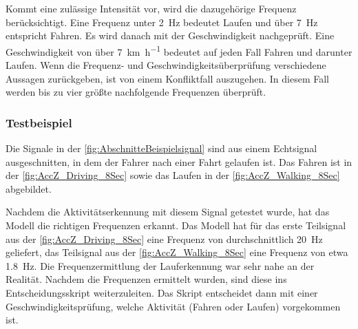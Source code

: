 Kommt eine zulässige Intensität vor, wird die dazugehörige Frequenz berücksichtigt. Eine Frequenz unter \SI{2}{\hertz} bedeutet \glqq Laufen\grqq{} und über \SI{7}{\hertz} entspricht \glqq Fahren\grqq{}. Es wird danach mit der Geschwindigkeit nachgeprüft. Eine Geschwindigkeit von über \SI[per-mode = symbol]{7}{\kilo\meter\per\hour} bedeutet auf jeden Fall \glqq Fahren\grqq{} und darunter \glqq Laufen\grqq{}.
Wenn die Frequenz- und Geschwindigkeitsüberprüfung verschiedene Aussagen zurückgeben, ist von einem Konfliktfall auszugehen. In diesem Fall werden bis zu vier größte nachfolgende Frequenzen überprüft.


\subsubsection{Testbeispiel}
Die Signale in der \autoref{fig:AbschnitteBeispielsignal} sind aus einem Echtsignal ausgeschnitten, in dem der Fahrer nach einer Fahrt gelaufen ist. Das Fahren ist in der \autoref{fig:AccZ_Driving_8Sec} sowie das Laufen in der \autoref{fig:AccZ_Walking_8Sec} abgebildet.

Nachdem die Aktivitätserkennung mit diesem Signal getestet wurde, hat das Modell die richtigen Frequenzen erkannt.
Das Modell hat für das erste Teilsignal aus der \autoref{fig:AccZ_Driving_8Sec} eine Frequenz von durchschnittlich \SI{20}{\hertz} geliefert, das Teilsignal aus der \autoref{fig:AccZ_Walking_8Sec} eine Frequenz von etwa \SI{1,8}{\hertz}. Die Frequenzermittlung der Lauferkennung war sehr nahe an der Realität.
Nachdem die Frequenzen ermittelt wurden, sind diese ins Entscheidungsskript weiterzuleiten. Das Skript entscheidet dann mit einer Geschwindigkeitsprüfung, welche Aktivität (Fahren oder Laufen) vorgekommen ist.


